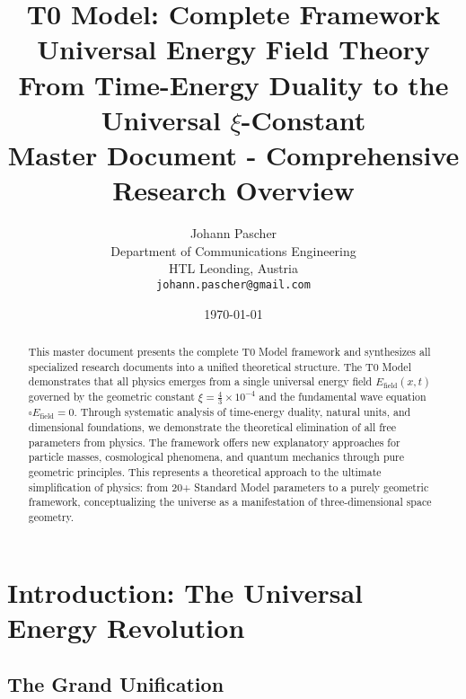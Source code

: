 \documentclass[12pt,a4paper]{report}
\newcommand{\xiconst}{\xi = \frac{4}{3} \times 10^{-4}}
\begin{document}
	
	\title{{\Huge T0 Model: Complete Framework}\\
		{\LARGE Universal Energy Field Theory}\\
		{\Large From Time-Energy Duality to the Universal $\xi$-Constant}\\
		\vspace{1cm}
		{\large Master Document - Comprehensive Research Overview}}
	
	\author{{\Large Johann Pascher}\\
		Department of Communications Engineering\\
		HTL Leonding, Austria\\
		\texttt{johann.pascher@gmail.com}}
	
	\date{\today}
	
	\maketitle
	
	\begin{abstract}
		This master document presents the complete T0 Model framework and synthesizes all specialized research documents into a unified theoretical structure. The T0 Model demonstrates that all physics emerges from a single universal energy field $E_{\text{field}}(x,t)$ governed by the geometric constant $\xiconst$ and the fundamental wave equation $\square E_{\text{field}} = 0$. Through systematic analysis of time-energy duality, natural units, and dimensional foundations, we demonstrate the theoretical elimination of all free parameters from physics. The framework offers new explanatory approaches for particle masses, cosmological phenomena, and quantum mechanics through pure geometric principles. This represents a theoretical approach to the ultimate simplification of physics: from 20+ Standard Model parameters to a purely geometric framework, conceptualizing the universe as a manifestation of three-dimensional space geometry.
	\end{abstract}
	
	\tableofcontents
	\listoftables
	
	\chapter{Introduction: The Universal Energy Revolution}
	
	\section{The Grand Unification}
	
\end{document}
